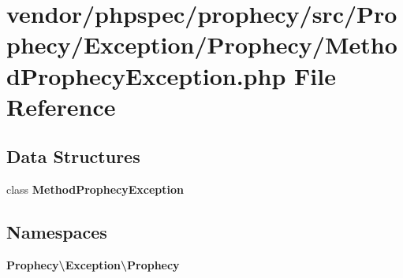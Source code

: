 \section{vendor/phpspec/prophecy/src/\+Prophecy/\+Exception/\+Prophecy/\+Method\+Prophecy\+Exception.php File Reference}
\label{_method_prophecy_exception_8php}
\subsection*{Data Structures}
\begin{DoxyCompactItemize}
\item 
class {\bf Method\+Prophecy\+Exception}
\end{DoxyCompactItemize}
\subsection*{Namespaces}
\begin{DoxyCompactItemize}
\item 
 {\bf Prophecy\textbackslash{}\+Exception\textbackslash{}\+Prophecy}
\end{DoxyCompactItemize}
